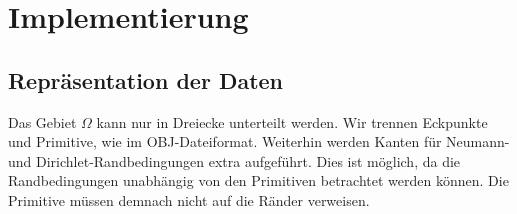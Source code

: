 \documentclass[crop=false,10pt,ngerman]{standalone}
\begin{document}
  \section{Implementierung} %
  \label{sec:implementierung}

    \subsection{Repräsentation der Daten} %
    \label{sub:repräsentation_der_daten}
      Das Gebiet $\Omega$ kann nur in Dreiecke unterteilt werden.
      Wir trennen Eckpunkte und Primitive, wie im OBJ-Dateiformat.
      Weiterhin werden Kanten für Neumann- und Dirichlet-Randbedingungen extra aufgeführt.
      Dies ist möglich, da die Randbedingungen unabhängig von den Primitiven betrachtet werden können.
      Die Primitive müssen demnach nicht auf die Ränder verweisen.
      \cite{Alberty1998}

\end{document}
